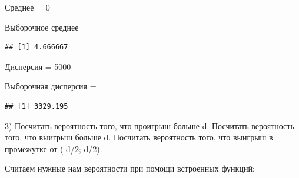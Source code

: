 \documentclass{article}\usepackage[]{graphicx}\usepackage[]{color}
\makeatletter
\newenvironment{kframe}{%
 \def\at@end@of@kframe{}%
 \ifinner\ifhmode%
  \def\at@end@of@kframe{\end{minipage}}%
  \begin{minipage}{\columnwidth}%
 \fi\fi%
 \def\FrameCommand##1{\hskip\@totalleftmargin \hskip-\fboxsep
 \colorbox{shadecolor}{##1}\hskip-\fboxsep
     \hskip-\linewidth \hskip-\@totalleftmargin \hskip\columnwidth}%
 \MakeFramed {\advance\hsize-\width
   \@totalleftmargin\z@ \linewidth\hsize
   \@setminipage}}%
 {\par\unskip\endMakeFramed%
 \at@end@of@kframe}
\newenvironment{knitrout}{}{} %
\makeatother
\begin{document}
Среднее = 0

Выборочное среднее = 
\begin{knitrout}
\color{fgcolor}\begin{kframe}
\begin{verbatim}
## [1] 4.666667
\end{verbatim}
\end{kframe}
\end{knitrout}
Дисперсия = 5000

Выборочная дисперсия = 
\begin{knitrout}
\color{fgcolor}\begin{kframe}
\begin{verbatim}
## [1] 3329.195
\end{verbatim}
\end{kframe}
\end{knitrout}
\newpage

3) Посчитать вероятность того, что проигрыш больше d. Посчитать вероятность того, что выигрыш больше d. Посчитать вероятность того, что выигрыш в промежутке от (-d/2; d/2).

Считаем нужные нам вероятности при помощи встроенных функций:
\end{document}
